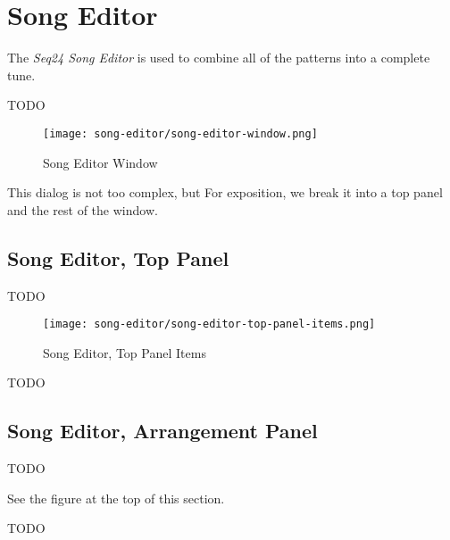 %
%
%

\section{Song Editor}
\label{sec:seq24_song_editor}

   The \textsl{Seq24 Song Editor} is used to combine all of the patterns
   into a complete tune.

   TODO

\begin{figure}[H]
   \centering 
   \texttt{[image: song-editor/song-editor-window.png]}
   \caption{Song Editor Window}
   \label{fig:song_editor_window}
\end{figure}

   This dialog is not too complex, but
   For exposition, we break it into a top panel and the rest of the window.

\subsection{Song Editor, Top Panel}
\label{subsec:seq24_song_editor_top}

   TODO

\begin{figure}[H]
   \centering 
   \texttt{[image: song-editor/song-editor-top-panel-items.png]}
   \caption{Song Editor, Top Panel Items}
   \label{fig:song_editor_top_panel_items}
\end{figure}

   TODO

\subsection{Song Editor, Arrangement Panel}
\label{subsec:seq24_song_editor_arrangement_panel}

   TODO

   See the figure at the top of this section.

   TODO


